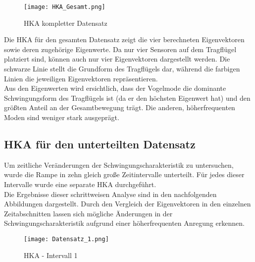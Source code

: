         \begin{figure}[H]
            \centering
            \texttt{[image: HKA\_Gesamt.png]}
            \caption{HKA kompletter Datensatz}
            \label{fig: HKA gesmat}
        \end{figure}

        \noindent
        Die HKA für den gesamten Datensatz zeigt die vier berechneten Eigenvektoren sowie deren 
        zugehörige Eigenwerte. Da nur vier Sensoren auf dem Tragflügel platziert sind, können 
        auch nur vier Eigenvektoren dargestellt werden. Die schwarze Linie stellt die Grundform 
        des Tragflügels dar, während die farbigen Linien die jeweiligen Eigenvektoren repräsentieren.
        \\

        \noindent
        Aus den Eigenwerten wird ersichtlich, dass der \glqq Vogelmode\grqq
        \hspace{0.05cm} die dominante Schwingungsform
        des Tragflügels ist (da er den höchsten Eigenwert hat) und den größten
        Anteil an der Gesamtbewegung trägt. Die anderen, höherfrequenten Moden
        sind weniger stark ausgeprägt.
    
    \subsection{HKA für den unterteilten Datensatz}
        Um zeitliche Veränderungen der Schwingungscharakteristik zu untersuchen, wurde die Rampe 
        in zehn gleich große Zeitintervalle unterteilt. Für jedes dieser Intervalle wurde eine 
        separate HKA durchgeführt.
        \\ 

        \noindent
        Die Ergebnisse dieser schrittweisen Analyse sind in den nachfolgenden Abbildungen dargestellt. 
        Durch den Vergleich der Eigenvektoren in den einzelnen Zeitabschnitten lassen sich mögliche 
        Änderungen in der Schwingungscharakteristik aufgrund einer höherfrequenten Anregung erkennen.

        \begin{figure}[H]
            \centering
            \texttt{[image: Datensatz\_1.png]}
            \caption{HKA - Intervall 1}
            \label{fig: HKA_intervall_1}
        \end{figure}


